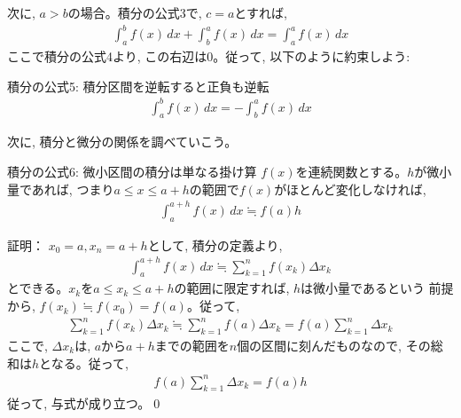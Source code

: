 次に, $a>b$の場合。積分の公式3で, $c=a$とすれば, 
\begin{eqnarray}
\int_{a}^{b}f(x)\, dx+\int_{b}^{a}f(x)\, dx=\int_{a}^{a}f(x)\, dx
\end{eqnarray}
ここで積分の公式4より, この右辺は0。従って, 以下のように約束しよう:
\begin{itembox}{積分の公式5: 積分区間を逆転すると正負も逆転}
\begin{eqnarray}
\int_{a}^{b}f(x)\,dx=-\int_{b}^{a}f(x)\,dx\label{eq:sekibun_koshiki5}
\end{eqnarray}
\end{itembox}
\vspace{0.3cm}

次に, 積分と微分の関係を調べていこう。

\begin{itembox}{積分の公式6: 微小区間の積分は単なる掛け算}
$f(x)$を連続関数とする。$h$が微小量であれば, つまり$a \le x \le a+h$の範囲で$f(x)$がほとんど変化しなければ, 
\begin{eqnarray}
\int_{a}^{a+h}f(x)\, dx\fallingdotseq f(a)h
\end{eqnarray}
\end{itembox}
証明： $x_0=a, x_n=a+h$として, 積分の定義より, 
\begin{eqnarray}
\int_{a}^{a+h}f(x)\, dx\fallingdotseq \sum_{k=1}^n f(x_k)\Delta x_k
\end{eqnarray}
とできる。$x_k$を$a \le x_k \le a+h$の範囲に限定すれば, $h$は微小量であるという
前提から, $f(x_k)\fallingdotseq f(x_0)=f(a)$。従って, 
\begin{eqnarray*}
\sum_{k=1}^n f(x_k)\Delta x_k \fallingdotseq \sum_{k=1}^n f(a)\Delta x_k = f(a)\sum_{k=1}^n \Delta x_k
\end{eqnarray*}
ここで, $\Delta x_k$は, $a$から$a+h$までの範囲を$n$個の区間に刻んだものなので, その総和は$h$となる。従って, 
\begin{eqnarray}
f(a)\sum_{k=1}^n \Delta x_k=f(a)h
\end{eqnarray}
従って, 与式が成り立つ。\qed
\vv

